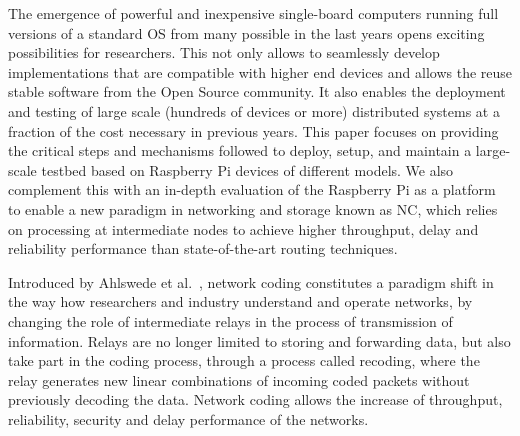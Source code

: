 %

The emergence of powerful and inexpensive single-board computers
running full versions of a standard \ac{OS} from many possible in the last
years opens exciting possibilities for researchers. This not only
allows to seamlessly develop implementations that are compatible with
higher end devices and allows the reuse stable software from the Open
Source community. It also enables the deployment and testing of large
scale (hundreds of devices or more) distributed systems at a fraction
of the cost necessary in previous years. This paper focuses on
providing the critical steps and mechanisms followed to deploy, setup,
and maintain a large-scale testbed based on Raspberry Pi devices of
different models. We also complement this with an in-depth evaluation
of the Raspberry Pi as a platform to enable a new paradigm in
networking and storage known as \ac{NC}, which relies on
processing at intermediate nodes to achieve higher throughput, delay
and reliability performance than state-of-the-art routing techniques.


Introduced by Ahlswede et al.~\cite{ahlswede2000network}, network
coding constitutes a paradigm shift in the way how researchers and
industry understand and operate networks, by changing the role of
intermediate relays in the process of transmission of information.
Relays are no longer limited to storing and forwarding data, but also
take part in the coding process, through a process called recoding,
where the relay generates new linear combinations of incoming coded
packets without previously decoding the data. Network coding allows
the increase of throughput, reliability, security and delay
performance of the networks. 

